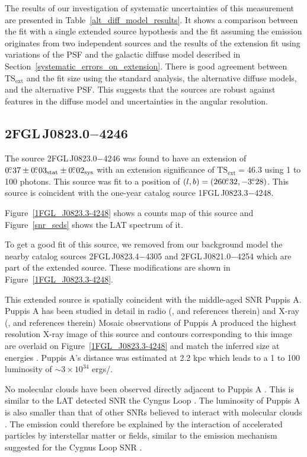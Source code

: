 \documentclass[12pt,preprint]{aastex}
\newcommand{\gev}{\text{GeV}\xspace}
\newcommand{\s}{\text{s}\xspace}
\newcommand{\tsext}{{\ensuremath{\text{TS}_{\text{ext}}}}\xspace}
\newcommand{\rosat}{\text{{\em ROSAT}}\xspace}
\newcommand{\sys}{\text{sys}\xspace}
\newcommand{\stat}{\text{stat}\xspace}
\newcommand{\hl}[1]{#1}
\begin{document}
The results of our investigation of systematic uncertainties of this
measurement are presented in 
Table~\ref{alt_diff_model_results}.  It
shows a comparison between the fit with a single extended source
hypothesis and the fit assuming the emission originates from two
independent sources and  the
results of the extension fit using variations of the PSF and the galactic
diffuse model described in Section~\ref{systematic_errors_on_extension}.
There is good agreement between \tsext and the fit size using
the standard analysis, the alternative diffuse models, and the alternative PSF.
This suggests that the sources are robust against features in the diffuse
model and uncertainties in the angular resolution.

\subsection{2FGL\,J0823.0$-$4246}
\label{section_2FGL_J0823.0-4246}


The source 2FGL\,J0823.0$-$4246 was found 
to have an 
extension of $0\fdg37\pm0\fdg03_\stat\pm0\fdg02_\sys$ 
with an extension
significance of $\tsext=46.3$
using 1 \gev to 100 \gev photons.  This source was fit to a position of
$(l,b)=(260\mbox{$.\!\!^\circ$}32,-3\mbox{$.\!\!^\circ$}28)$.  
This source is coincident with the one-year
catalog source 1FGL\,J0823.3$-$4248.
\hl{
Figure~\ref{1FGL_J0823.3-4248} shows a
counts map of this source
and Figure~\ref{snr_seds} shows the LAT spectrum of it.
}
To get a good fit of this source, we removed from our background
model the nearby catalog
sources 2FGL\,J0823.4$-$4305 and 2FGL\,J0821.0$-$4254 which are part of the
extended source.  These modifications are
shown in Figure~\ref{1FGL_J0823.3-4248}.

\hl{
This extended source is spatially coincident with the middle-aged
SNR Puppis A.  Puppis A has been studied in detail in radio
(\cite{puppis_a_vla}, and references therein) and  X-ray 
(\cite{rosat_puppis_a,suzaku_puppis_a}, and references therein)
Mosaic \rosat observations of Puppis A produced the highest
resolution X-ray image of this source
and contours corresponding to this
image are overlaid on Figure~\ref{1FGL_J0823.3-4248} and match the
inferred size at \gev energies \citep{rosat_puppis_a}.
Puppis A's distance was estimated at 2.2 kpc \citep{reynoso_1995,reynoso_2003}
which leads to a 1 \gev to 100 \gev luminosity of $\sim 3\times 10^{34}$ ergs/\s.

No molecular clouds have been observed directly adjacent to Puppis A 
\citep{co_eastern_puppis_a}.
This is similar to the LAT detected SNR the Cyngus Loop \citep{cygnus_loop_lat}.
The luminosity of Puppis A is also smaller than that of 
other SNRs believed to interact with molecular clouds
\citep{w51c,ic443,w44,w28,w49b_lat}.
The \gev emission could therefore be explained by the interaction
of accelerated particles by interstellar matter or fields, similar
to the emission mechanism suggested for the Cygnus Loop SNR
\citep{cygnus_loop_lat}.
}
\end{document}
